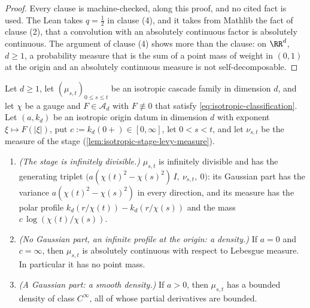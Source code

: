 \begin{proof}
Every clause is machine-checked, along this proof, and no cited fact is used. The Lean takes
$q = \tfrac12$ in clause (4), and it takes from Mathlib the fact of clause (2), that a
convolution with an absolutely continuous factor is absolutely continuous. The argument of
clause (4) shows more than the clause: on $\RR^d$, $d \ge 1$, a probability measure that is the
sum of a point mass of weight in $(0,1)$ at the origin and an absolutely continuous measure is
not self-decomposable.
\end{proof}

\begin{proposition}
\label{prop:isotropic-stage-density}
\leanok
Let $d \ge 1$, let $(\mu_{s,t})_{0 \le s \le t}$ be an isotropic cascade family in dimension $d$,
and let $\chi$ be a gauge and $F \in \mathcal{A}_d$ with $F \not\equiv 0$ that satisfy
\ref{eq:isotropic-classification}. Let $(a, k_d)$ be an isotropic origin datum in dimension $d$
with exponent $\xi \mapsto F(|\xi|)$, put $c := k_d(0{+}) \in [0,\infty]$, let $0 < s < t$, and
let $\nu_{s,t}$ be the \Levy{} measure of the stage (\ref{lem:isotropic-stage-levy-measure}).
\begin{enumerate}
\item \emph{(The stage is infinitely divisible.)} $\mu_{s,t}$ is infinitely divisible and has the
generating triplet $\bigl(a(\chi(t)^2 - \chi(s)^2)\,I,\ \nu_{s,t},\ 0\bigr)$: its Gaussian part
has the variance $a(\chi(t)^2 - \chi(s)^2)$ in every direction, and its \Levy{} measure has the
polar profile $k_d(r/\chi(t)) - k_d(r/\chi(s))$ and the mass $c\,\log(\chi(t)/\chi(s))$.
\item \emph{(No Gaussian part, an infinite profile at the origin: a density.)} If $a = 0$ and
$c = \infty$, then $\mu_{s,t}$ is absolutely continuous with respect to Lebesgue measure. In
particular it has no point mass.
\item \emph{(A Gaussian part: a smooth density.)} If $a > 0$, then $\mu_{s,t}$ has a bounded
density of class $C^\infty$, all of whose partial derivatives are bounded.
\end{enumerate}

\end{proposition}
